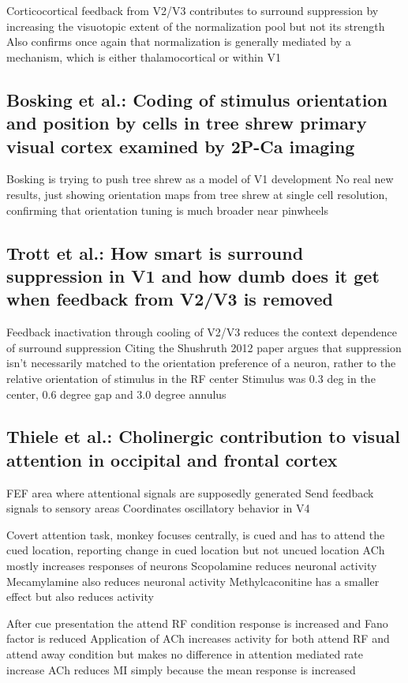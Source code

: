 \documentclass[11pt]{Science}
\begin{document}
Corticocortical feedback from V2/V3 contributes to surround suppression by increasing the visuotopic extent of the normalization pool but not its strength
Also confirms once again that normalization is generally mediated by a mechanism, which is either thalamocortical or within V1

\subsection{Bosking et al.: Coding of stimulus orientation and position by cells in tree shrew primary visual cortex examined by 2P-Ca imaging}
\label{sec-2.9}


Bosking is trying to push tree shrew as a model of V1 development
No real new results, just showing orientation maps from tree shrew at single cell resolution, confirming that orientation tuning is much broader near pinwheels

\subsection{Trott et al.: How smart is surround suppression in V1 and how dumb does it get when feedback from V2/V3 is removed}
\label{sec-2.10}


Feedback inactivation through cooling of V2/V3 reduces the context dependence of surround suppression
Citing the Shushruth 2012 paper argues that suppression isn't necessarily matched to the orientation preference of a neuron, rather to the relative orientation of stimulus in the RF center
Stimulus was 0.3 deg in the center, 0.6 degree gap and 3.0 degree annulus

\subsection{Thiele et al.: Cholinergic contribution to visual attention in occipital and frontal cortex}
\label{sec-2.11}


FEF area where attentional signals are supposedly generated
Send feedback signals to sensory areas
Coordinates oscillatory behavior in V4

Covert attention task, monkey focuses centrally, is cued and has to attend the cued location, reporting change in cued location but not uncued location
ACh mostly increases responses of neurons
Scopolamine reduces neuronal activity
Mecamylamine also reduces neuronal activity
Methylcaconitine has a smaller effect but also reduces activity

After cue presentation the attend RF condition response is increased and Fano factor is reduced
Application of ACh increases activity for both attend RF and attend away condition but makes no difference in attention mediated rate increase
ACh reduces MI simply because the mean response is increased
\end{document}
